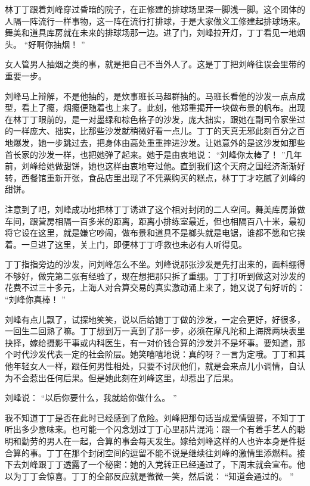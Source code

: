 \documentclass[12pt,twoside,openany]{book}
\begin{document}
林丁丁跟着刘峰穿过昏暗的院子，在正修建的排球场里深一脚浅一脚。这个团体的人隔一阵流行一样事物，这一阵在流行打排球，于是大家做义工修建起排球场来。舞美和道具库房就在未来的排球场那一边。进了门，刘峰拉开灯，丁丁看见一地烟头。 “好啊你抽烟！ ”

女人管男人抽烟之类的事，就是把自己不当外人了。这是丁丁把刘峰往误会里带的重要一步。

刘峰马上辩解，不是他抽的，是炊事班长马超群抽的。马班长看他的沙发一点点成型，看上了瘾，烟瘾便随着也上来了。此刻，他郑重揭开一块做布景的帆布。出现在林丁丁眼前的，是一对墨绿和棕色格子的沙发，庞大拙实，跟她在副司令家坐过的一样庞大、拙实，比那些沙发就稍微好看一点儿。丁丁的天真无邪此刻百分之百地爆发，她一步跳过去，把身体由高处重重摔进沙发。让她意外的是这沙发如那些首长家的沙发一样，也把她弹了起来。她于是由衷地说： “刘峰你太棒了！ ”几年前，刘峰给她做甜饼，她也这样由衷地夸过他。直到我们这个天府之国经济渐渐好转，西餐馆重新开张，食品店里出现了不凭票购买的糕点，林丁丁才吃腻了刘峰的甜饼。

注意到了吧，刘峰成功地把林丁丁诱进了这个相对封闭的二人空间。舞美库房兼做车间，跟营房相隔一百多米的距离，距离小排练室最近，但也相隔百八十米，最初将它设在这里，就是嫌它吵闹，做布景和道具不是榔头就是电锯，谁都不愿和它挨着。一旦进了这里，关上门，即便林丁丁呼救也未必有人听得见。

丁丁指指旁边的沙发，问刘峰怎么不坐。刘峰说那张沙发是先打出来的，面料绷得不够好，做完第二张有经验了，现在想把那只拆了重绷。丁丁打听到做这对沙发的花费不过三十多元，上海人对合算交易的真实激动涌上来了，她又说了句好听的： “刘峰你真棒！ ”

刘峰有点儿飘了，试探地笑笑，说以后给她丁丁做的沙发，一定会更好，好很多，一回生二回熟了嘛。丁丁想到万一真到了那一步，必须在摩凡陀和上海牌两块表里抉择，嫁给摄影干事或内科医生，有一对价钱合算的沙发并不是坏事。要知道，那个时代沙发代表一定的社会阶层。她笑嘻嘻地说：真的呀？一言为定哦。丁丁和其他年轻女人一样，跟任何男性相处，只要不讨厌他们，就是会来点儿小调情，自认为不会惹出任何后果。但是她此刻在刘峰这里，却惹出了后果。

刘峰说： “以后你要什么，我就给你做什么。 ”

我不知道丁丁是否在此时已经感到了危险。刘峰把那句话当成爱情盟誓，不知丁丁听出多少意味来。也可能一个闪念划过丁丁心里那片混沌：跟一个有着手艺人的聪明和勤劳的男人在一起，合算的事会每天发生。嫁给刘峰这样的人也许本身是件挺合算的事。丁丁在那个封闭空间的逗留不能不说是继续往刘峰的激情里添燃料。接下去刘峰跟丁丁透露了一个秘密：她的入党转正已经通过了，下周末就会宣布。他以为丁丁会惊喜。丁丁的全部反应就是微微一笑，然后说： “知道会通过的。 ”
\end{document}

